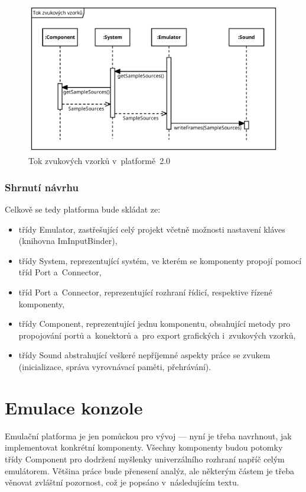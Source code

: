 \begin{figure}[ht!]
	\centering
	\caption{Tok zvukových vzorků v~platformě~2.0}\label{fig:navrh-audio-tok}
	\includegraphics[width=1.0\textwidth]{images/tok_vzorku.pdf}
\end{figure}

\subsubsection{Shrnutí návrhu}
Celkově se tedy platforma bude skládat ze:
\begin{itemize}
	\item třídy Emulator, zastřešující celý projekt včetně možnosti nastavení kláves (knihovna ImInputBinder),
	\item třídy System, reprezentující systém, ve kterém se komponenty propojí pomocí tříd Port a~Connector,
	\item tříd Port a~Connector, reprezentující rozhraní řídicí, respektive řízené komponenty,
	\item třídy Component, reprezentující jednu komponentu, obsahující metody pro propojování portů a~konektorů a~pro export grafických i~zvukových vzorků,
	\item třídy Sound abstrahující veškeré nepříjemné aspekty práce se zvukem (inicializace, správa vyrovnávací paměti, přehrávání).
\end{itemize}

\section{Emulace konzole}
Emulační platforma je jen pomůckou pro vývoj --- nyní je třeba navrhnout, jak implementovat konkrétní komponenty. Všechny komponenty budou potomky třídy Component pro dodržení myšlenky univerzálního rozhraní napříč celým emulátorem. Většina práce bude přenesení analýz, ale některým částem je třeba věnovat zvláštní pozornost, což je popsáno v~následujícím textu.

